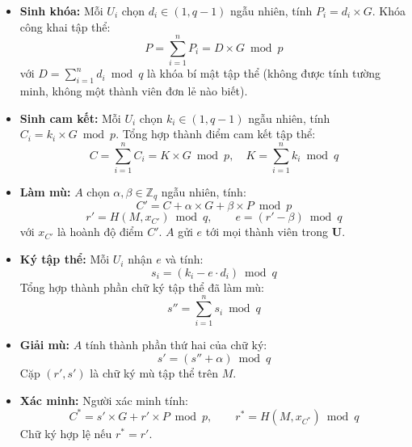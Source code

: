 \begin{itemize}
    \item \textbf{Sinh khóa:} Mỗi $U_i$ chọn $d_i \in (1, q-1)$ ngẫu nhiên, tính $P_i = d_i \times G$. Khóa công khai tập thể:
    \begin{equation}
        P = \sum_{i=1}^{n} P_i = D \times G \bmod p
        \label{eq:bms-pubkey}
    \end{equation}
    với $D = \sum_{i=1}^{n} d_i \bmod q$ là khóa bí mật tập thể (không được tính tường minh, không một thành viên đơn lẻ nào biết).

    \item \textbf{Sinh cam kết:} Mỗi $U_i$ chọn $k_i \in (1, q-1)$ ngẫu nhiên, tính $C_i = k_i \times G \bmod p$. Tổng hợp thành điểm cam kết tập thể:
    \begin{equation}
        C = \sum_{i=1}^{n} C_i = K \times G \bmod p, \quad K = \sum_{i=1}^{n} k_i \bmod q
        \label{eq:bms-commit}
    \end{equation}

    \item \textbf{Làm mù:} $A$ chọn $\alpha, \beta \in \mathbb{Z}_q$ ngẫu nhiên, tính:
    \begin{equation}
        C' = C + \alpha \times G + \beta \times P \bmod p
        \label{eq:bms-blind-c}
    \end{equation}
    \begin{equation}
        r' = H(M, x_{C'}) \bmod q, \qquad e = (r' - \beta) \bmod q
        \label{eq:bms-blind-challenge}
    \end{equation}
    với $x_{C'}$ là hoành độ điểm $C'$. $A$ gửi $e$ tới mọi thành viên trong $\mathbf{U}$.

    \item \textbf{Ký tập thể:} Mỗi $U_i$ nhận $e$ và tính:
    \begin{equation}
        s_i = (k_i - e \cdot d_i) \bmod q
        \label{eq:bms-sign-i}
    \end{equation}
    Tổng hợp thành phần chữ ký tập thể đã làm mù:
    \begin{equation}
        s'' = \sum_{i=1}^{n} s_i \bmod q
        \label{eq:bms-sign-aggregate}
    \end{equation}

    \item \textbf{Giải mù:} $A$ tính thành phần thứ hai của chữ ký:
    \begin{equation}
        s' = (s'' + \alpha) \bmod q
        \label{eq:bms-unblind}
    \end{equation}
    Cặp $(r', s')$ là chữ ký mù tập thể trên $M$.

    \item \textbf{Xác minh:} Người xác minh tính:
    \begin{equation}
        C^* = s' \times G + r' \times P \bmod p, \qquad r^* = H(M, x_{C^*}) \bmod q
        \label{eq:bms-verify}
    \end{equation}
    Chữ ký hợp lệ nếu $r^* = r'$.
\end{itemize}

